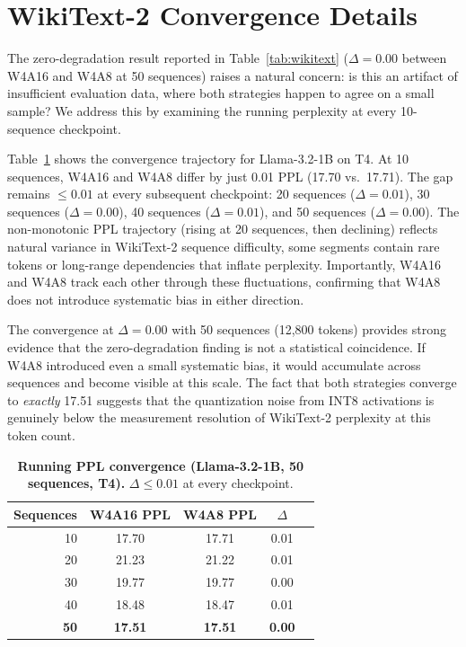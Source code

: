 \documentclass{article}
\begin{document}
\section{WikiText-2 Convergence Details}
\label{app:convergence}

The zero-degradation result reported in Table~\ref{tab:wikitext} ($\Delta = 0.00$ between
W4A16 and W4A8 at 50 sequences) raises a natural concern: is this an artifact of insufficient
evaluation data, where both strategies happen to agree on a small sample? We address this by
examining the running perplexity at every 10-sequence checkpoint.

Table~\ref{tab:convergence} shows the convergence trajectory for Llama-3.2-1B on T4. At
10 sequences, W4A16 and W4A8 differ by just 0.01 PPL (17.70 vs.\ 17.71). The gap remains
$\leq 0.01$ at every subsequent checkpoint: 20 sequences ($\Delta = 0.01$), 30 sequences
($\Delta = 0.00$), 40 sequences ($\Delta = 0.01$), and 50 sequences ($\Delta = 0.00$).
The non-monotonic PPL trajectory (rising at 20 sequences, then declining) reflects natural
variance in WikiText-2 sequence difficulty, some segments contain rare tokens or long-range
dependencies that inflate perplexity. Importantly, W4A16 and W4A8 track each other through
these fluctuations, confirming that W4A8 does not introduce systematic bias in either
direction.

The convergence at $\Delta = 0.00$ with 50 sequences (12,800 tokens) provides strong
evidence that the zero-degradation finding is not a statistical coincidence. If W4A8
introduced even a small systematic bias, it would accumulate across sequences and become
visible at this scale. The fact that both strategies converge to \emph{exactly} 17.51
suggests that the quantization noise from INT8 activations is genuinely below the
measurement resolution of WikiText-2 perplexity at this token count.

\begin{table}[h]
\centering
\caption{\textbf{Running PPL convergence (Llama-3.2-1B, 50 sequences, T4).}
$\Delta \leq 0.01$ at every checkpoint.}
\label{tab:convergence}
\small
\begin{tabular}{rcccc}
\toprule
Sequences & W4A16 PPL & W4A8 PPL & $\Delta$ \\
\midrule
10 & 17.70 & 17.71 & 0.01 \\
20 & 21.23 & 21.22 & 0.01 \\
30 & 19.77 & 19.77 & 0.00 \\
40 & 18.48 & 18.47 & 0.01 \\
\textbf{50} & \textbf{17.51} & \textbf{17.51} & \textbf{0.00} \\
\bottomrule
\end{tabular}
\end{table}
\end{document}
